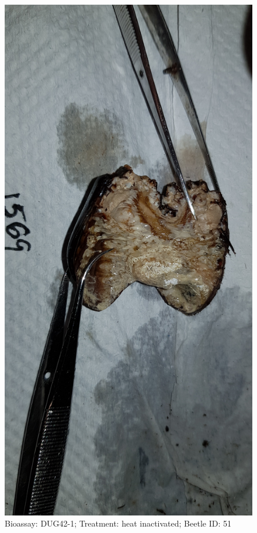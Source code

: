 \documentclass[11pt]{scrartcl}
\begin{document}
\begin{figure}[h!]
    \centering
    \includegraphics[width=\linewidth, height=\textheight, keepaspectratio]{uploads/btl.pm_image.bcf926e3e475d507.447567343220313536395f5265702d3120636f6e74726f6c2e6a7067.jpg}
    \caption{Bioassay: DUG42-1; Treatment: heat inactivated; Beetle ID: 51}
\end{figure}
\clearpage
\end{document}
